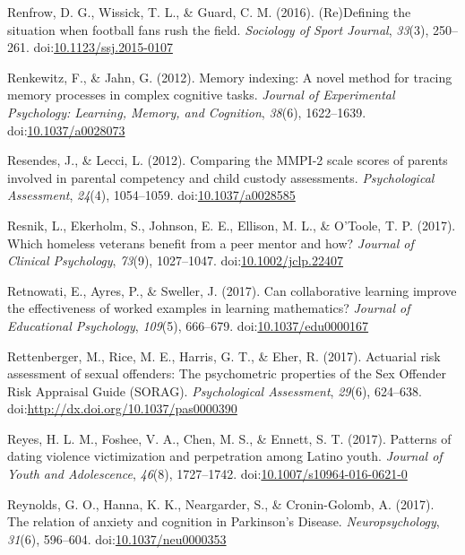 \documentclass[english,man]{apa6}
\theoremstyle{definition}
\theoremstyle{definition}
\theoremstyle{definition}
\theoremstyle{remark}
\begin{document}
\hypertarget{ref-Renfrow2016}{}
Renfrow, D. G., Wissick, T. L., \& Guard, C. M. (2016). (Re)Defining the
situation when football fans rush the field. \emph{Sociology of Sport
Journal}, \emph{33}(3), 250--261.
doi:\href{https://doi.org/10.1123/ssj.2015-0107}{10.1123/ssj.2015-0107}

\hypertarget{ref-Renkewitz2012}{}
Renkewitz, F., \& Jahn, G. (2012). Memory indexing: A novel method for
tracing memory processes in complex cognitive tasks. \emph{Journal of
Experimental Psychology: Learning, Memory, and Cognition}, \emph{38}(6),
1622--1639.
doi:\href{https://doi.org/10.1037/a0028073}{10.1037/a0028073}

\hypertarget{ref-Resendes2012}{}
Resendes, J., \& Lecci, L. (2012). Comparing the MMPI-2 scale scores of
parents involved in parental competency and child custody assessments.
\emph{Psychological Assessment}, \emph{24}(4), 1054--1059.
doi:\href{https://doi.org/10.1037/a0028585}{10.1037/a0028585}

\hypertarget{ref-Resnik2017}{}
Resnik, L., Ekerholm, S., Johnson, E. E., Ellison, M. L., \& O'Toole, T.
P. (2017). Which homeless veterans benefit from a peer mentor and how?
\emph{Journal of Clinical Psychology}, \emph{73}(9), 1027--1047.
doi:\href{https://doi.org/10.1002/jclp.22407}{10.1002/jclp.22407}

\hypertarget{ref-Retnowati2017}{}
Retnowati, E., Ayres, P., \& Sweller, J. (2017). Can collaborative
learning improve the effectiveness of worked examples in learning
mathematics? \emph{Journal of Educational Psychology}, \emph{109}(5),
666--679.
doi:\href{https://doi.org/10.1037/edu0000167}{10.1037/edu0000167}

\hypertarget{ref-Rettenberger2017}{}
Rettenberger, M., Rice, M. E., Harris, G. T., \& Eher, R. (2017).
Actuarial risk assessment of sexual offenders: The psychometric
properties of the Sex Offender Risk Appraisal Guide (SORAG).
\emph{Psychological Assessment}, \emph{29}(6), 624--638.
doi:\href{https://doi.org/http://dx.doi.org/10.1037/pas0000390}{http://dx.doi.org/10.1037/pas0000390}

\hypertarget{ref-Reyes2017}{}
Reyes, H. L. M., Foshee, V. A., Chen, M. S., \& Ennett, S. T. (2017).
Patterns of dating violence victimization and perpetration among Latino
youth. \emph{Journal of Youth and Adolescence}, \emph{46}(8),
1727--1742.
doi:\href{https://doi.org/10.1007/s10964-016-0621-0}{10.1007/s10964-016-0621-0}

\hypertarget{ref-Reynolds2017}{}
Reynolds, G. O., Hanna, K. K., Neargarder, S., \& Cronin-Golomb, A.
(2017). The relation of anxiety and cognition in Parkinson's Disease.
\emph{Neuropsychology}, \emph{31}(6), 596--604.
doi:\href{https://doi.org/10.1037/neu0000353}{10.1037/neu0000353}
\end{document}
